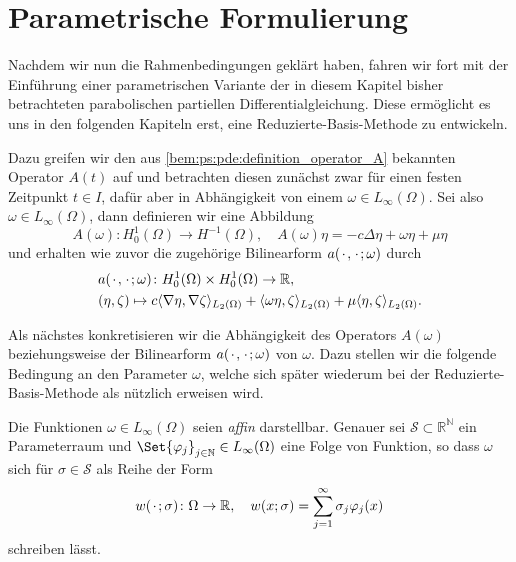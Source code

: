 

\section{Parametrische Formulierung} %
\label{sec:ps:pf:parametrische_formulierung}

Nachdem wir nun die Rahmenbedingungen geklärt haben, fahren wir fort mit der Einführung einer parametrischen Variante der in diesem Kapitel bisher betrachteten parabolischen partiellen Differentialgleichung.
Diese ermöglicht es uns in den folgenden Kapiteln erst, eine Reduzierte-Basis-Methode zu entwickeln.

Dazu greifen wir den aus \cref{bem:ps:pde:definition_operator_A} bekannten Operator $A(t)$ auf und betrachten diesen zunächst zwar für einen festen Zeitpunkt $t \in I$, dafür aber in Abhängigkeit von einem $\omega \in L_{\infty}(\Omega)$.
Sei also $\omega \in L_{\infty}(\Omega)$, dann definieren wir eine Abbildung
\begin{equation}
    \label{eq:ps:pf:operator_A}
    A(\omega) \colon H^{1}_{0}(\Omega) \to H^{-1}(\Omega), \quad A(\omega) \eta = - c \Delta \eta + \omega \eta + \mu \eta
\end{equation}
und erhalten wie zuvor die zugehörige Bilinearform $a({\mkern2mu\cdot\mkern2mu}, {\mkern2mu\cdot\mkern2mu}; \omega)$ durch
\begin{equation}
    \label{eq:ps:pf:bilinearform_a}
    \begin{aligned}
        &a({\mkern2mu\cdot\mkern2mu}, {\mkern2mu\cdot\mkern2mu}; \omega) \colon H^{1}_{0}(\Omega) \times H^{1}_{0}(\Omega) \to \mathbb{R}, \\
        &(\eta, \zeta) \mapsto c\langle\nabla \eta,\nabla \zeta\rangle_{L_{2}(\Omega)} + \langle\omega \eta,\zeta\rangle_{L_{2}(\Omega)} + \mu \langle\eta,\zeta\rangle_{L_{2}(\Omega)}.
    \end{aligned}
\end{equation}

Als nächstes konkretisieren wir die Abhängigkeit des Operators $A(\omega)$ beziehungsweise der Bilinearform $a({\mkern2mu\cdot\mkern2mu}, {\mkern2mu\cdot\mkern2mu}; \omega)$ von $\omega$.
Dazu stellen wir die folgende Bedingung an den Parameter $\omega$, welche sich später wiederum bei der Reduzierte-Basis-Methode als nützlich erweisen wird.

\begin{Definition}
\label{def:ps:pf:omega_affin}
    Die Funktionen $\omega \in L_{\infty}(\Omega)$ seien \emph{affin} darstellbar.
    Genauer sei $\mathcal S \subset \mathbb{R}^{\mathbb{N}}$ ein Parameterraum und $\Set{ \varphi_{j} }_{j \in \mathbb{N}} \in L_{\infty}(\Omega)$ eine Folge von Funktion, so dass $\omega$ sich für $\sigma \in \mathcal S$ als Reihe der Form
    \begin{equation}
    \label{eq:ps:pf:omega_affine_zerlegung}
        w({\mkern2mu\cdot\mkern2mu}; \sigma) \colon \Omega \to \mathbb{R}, \quad w(x; \sigma) = \sum_{j = 1}^{\infty} \sigma_{j} \varphi_{j}(x)
    \end{equation}
    schreiben lässt.
\end{Definition}

